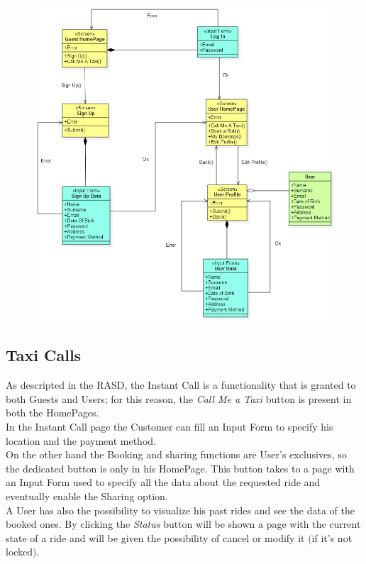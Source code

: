 	\begin{figure}[h!]
		\centering
		\includegraphics[height=0.65\textheight]{UXDiagrams/UXProfile.jpg}
	\end{figure}
	
\newpage
\subsection{Taxi Calls}
As descripted in the RASD, the Instant Call is a functionality that is granted to both Guests and Users; for this reason, the \textit{Call Me a Taxi} button is present in both the HomePages. \\
In the Instant Call page the Customer can fill an Input Form to specify his location and the payment method.\\
On the other hand the Booking and sharing functions are User's exclusives, so the dedicated button is only in his HomePage. This button takes to a page with an Input Form used to specify all the data about the requested ride and eventually enable the Sharing option.\\
A User has also the possibility to visualize his past rides and see the data of the booked ones. By clicking the \textit{Status} button will be shown a page with the current state of a ride and will be given the possibility of cancel or modify it $($if it's not locked$)$.

